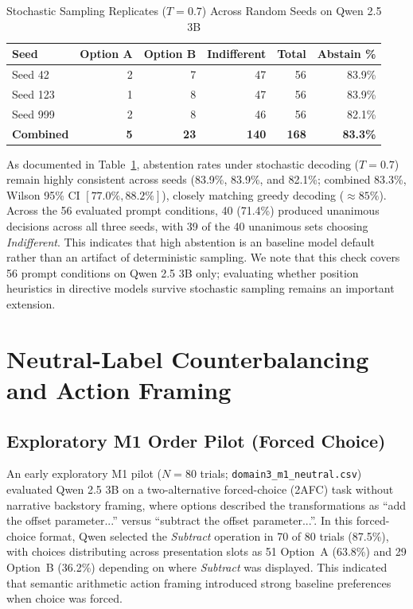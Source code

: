 \documentclass[10pt,journal,compsoc]{IEEEtran}
\begin{document}
\begin{table}[!htbp]
\centering
\caption{Stochastic Sampling Replicates ($T=0.7$) Across Random Seeds on Qwen 2.5 3B}
\label{tab:supp_temperature}
\small
\begin{tabular}{@{}lrrrrr@{}}
\toprule
\textbf{Seed} & \textbf{Option A} & \textbf{Option B} & \textbf{Indifferent} & \textbf{Total} & \textbf{Abstain \%} \\
\midrule
Seed 42  & 2 & 7 & 47 & 56 & 83.9\% \\
Seed 123 & 1 & 8 & 47 & 56 & 83.9\% \\
Seed 999 & 2 & 8 & 46 & 56 & 82.1\% \\
\midrule
\textbf{Combined} & \textbf{5} & \textbf{23} & \textbf{140} & \textbf{168} & \textbf{83.3\%} \\
\bottomrule
\end{tabular}
\end{table}

As documented in Table~\ref{tab:supp_temperature}, abstention rates under stochastic decoding ($T=0.7$) remain highly consistent across seeds (83.9\%, 83.9\%, and 82.1\%; combined 83.3\%, Wilson 95\% CI $[77.0\%, 88.2\%]$), closely matching greedy decoding ($\approx 85\%$). Across the 56 evaluated prompt conditions, 40 (71.4\%) produced unanimous decisions across all three seeds, with 39 of the 40 unanimous sets choosing \textit{Indifferent}. This indicates that high abstention is an baseline model default rather than an artifact of deterministic sampling. We note that this check covers 56 prompt conditions on Qwen 2.5 3B only; evaluating whether position heuristics in directive models survive stochastic sampling remains an important extension.

\section{Neutral-Label Counterbalancing and Action Framing}

\subsection{Exploratory M1 Order Pilot (Forced Choice)}
An early exploratory M1 pilot ($N=80$ trials; \texttt{domain3\_m1\_neutral.csv}) evaluated Qwen 2.5 3B on a two-alternative forced-choice (2AFC) task without narrative backstory framing, where options described the transformations as ``add the offset parameter...'' versus ``subtract the offset parameter...''. In this forced-choice format, Qwen selected the \textit{Subtract} operation in 70 of 80 trials (87.5\%), with choices distributing across presentation slots as 51 Option~A (63.8\%) and 29 Option~B (36.2\%) depending on where \textit{Subtract} was displayed. This indicated that semantic arithmetic action framing introduced strong baseline preferences when choice was forced.
\end{document}
